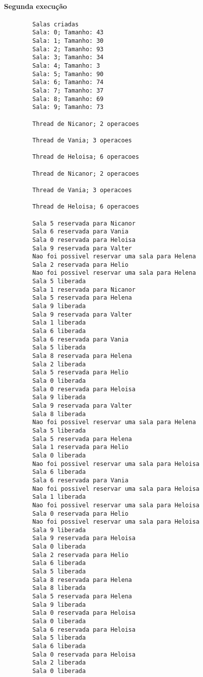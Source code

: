 \documentclass[12pt]{article}
\begin{document}
    \paragraph{Segunda execução}

    \begin{verbatim}
        Salas criadas
        Sala: 0; Tamanho: 43
        Sala: 1; Tamanho: 30
        Sala: 2; Tamanho: 93
        Sala: 3; Tamanho: 34
        Sala: 4; Tamanho: 3
        Sala: 5; Tamanho: 90
        Sala: 6; Tamanho: 74
        Sala: 7; Tamanho: 37
        Sala: 8; Tamanho: 69
        Sala: 9; Tamanho: 73

        Thread de Nicanor; 2 operacoes

        Thread de Vania; 3 operacoes

        Thread de Heloisa; 6 operacoes

        Thread de Nicanor; 2 operacoes

        Thread de Vania; 3 operacoes

        Thread de Heloisa; 6 operacoes

        Sala 5 reservada para Nicanor
        Sala 6 reservada para Vania
        Sala 0 reservada para Heloisa
        Sala 9 reservada para Valter
        Nao foi possivel reservar uma sala para Helena
        Sala 2 reservada para Helio
        Nao foi possivel reservar uma sala para Helena
        Sala 5 liberada
        Sala 1 reservada para Nicanor
        Sala 5 reservada para Helena
        Sala 9 liberada
        Sala 9 reservada para Valter
        Sala 1 liberada
        Sala 6 liberada
        Sala 6 reservada para Vania
        Sala 5 liberada
        Sala 8 reservada para Helena
        Sala 2 liberada
        Sala 5 reservada para Helio
        Sala 0 liberada
        Sala 0 reservada para Heloisa
        Sala 9 liberada
        Sala 9 reservada para Valter
        Sala 8 liberada
        Nao foi possivel reservar uma sala para Helena
        Sala 5 liberada
        Sala 5 reservada para Helena
        Sala 1 reservada para Helio
        Sala 0 liberada
        Nao foi possivel reservar uma sala para Heloisa
        Sala 6 liberada
        Sala 6 reservada para Vania
        Nao foi possivel reservar uma sala para Heloisa
        Sala 1 liberada
        Nao foi possivel reservar uma sala para Heloisa
        Sala 0 reservada para Helio
        Nao foi possivel reservar uma sala para Heloisa
        Sala 9 liberada
        Sala 9 reservada para Heloisa
        Sala 0 liberada
        Sala 2 reservada para Helio
        Sala 6 liberada
        Sala 5 liberada
        Sala 8 reservada para Helena
        Sala 8 liberada
        Sala 5 reservada para Helena
        Sala 9 liberada
        Sala 0 reservada para Heloisa
        Sala 0 liberada
        Sala 6 reservada para Heloisa
        Sala 5 liberada
        Sala 6 liberada
        Sala 0 reservada para Heloisa
        Sala 2 liberada
        Sala 0 liberada
    \end{verbatim}
\end{document}
